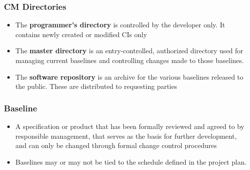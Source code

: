 \documentclass{article}
\begin{document}
\subsubsection{CM Directories}
\begin{itemize}
    \item The \textbf{programmer's directory} is controlled by the developer only. It contains newly created or modified CIs only
    
    \item The \textbf{master directory} is an entry-controlled, authorized directory used for managing current baselines and controlling changes made to those baselines. 
    
    \item The \textbf{software repository} is an archive for the various baselines released to the public. These are distributed to requesting parties 
\end{itemize}

\subsubsection{Baseline}
\begin{itemize}
    \item A specification or product that has been formally reviewed and agreed to by responsible management, that serves as the basis for further development, and can only be changed through formal change control procedures
    
    \item Baselines may or may not be tied to the schedule defined in the project plan. 
\end{itemize}
\end{document}
